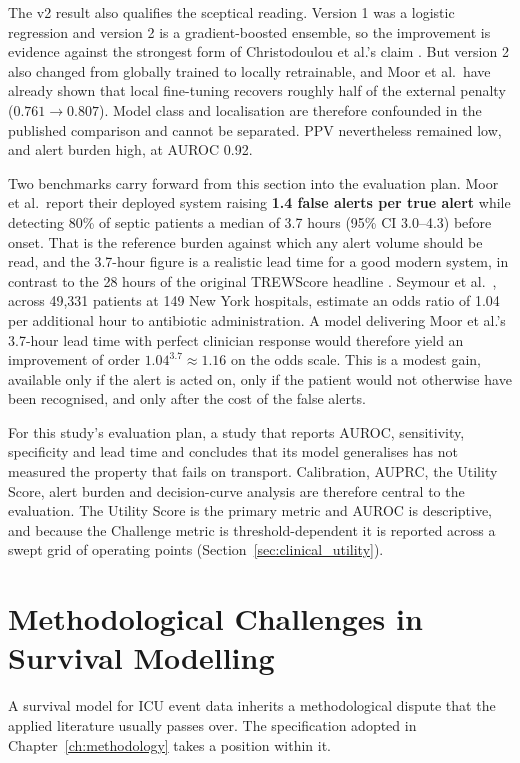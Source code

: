 The v2 result also qualifies the sceptical reading. Version 1 was a logistic
regression and version 2 is a gradient-boosted
ensemble, so the improvement is evidence against the strongest form of
Christodoulou et al.'s claim \cite{christodoulou2019cox}. But version 2 also
changed from globally trained to locally retrainable, and Moor et al.\ have
already shown that local fine-tuning recovers roughly half of the external
penalty ($0.761 \rightarrow 0.807$). Model class and localisation are therefore
confounded in the published comparison and cannot be separated. PPV
nevertheless remained low, and alert burden high, at AUROC 0.92.

Two benchmarks carry forward from this section into the evaluation plan. Moor
et al.\ report their deployed system raising \textbf{1.4 false alerts per true
alert} while detecting 80\% of septic patients a median of 3.7 hours (95\% CI
3.0--4.3) before onset. That is the reference burden against which any alert
volume should be read, and the 3.7-hour figure is a realistic lead time for a
good modern system, in contrast to the 28 hours of the original TREWScore
headline
\cite{henry2015trewscore}. Seymour et al.\ \cite{seymour2017time}, across
49,331 patients at 149 New York hospitals, estimate an odds ratio of 1.04 per
additional hour to antibiotic administration. A model delivering Moor et al.'s
3.7-hour lead time with perfect clinician response would therefore yield an
improvement of order $1.04^{3.7} \approx 1.16$ on the odds scale. This is a
modest gain, available only if the alert is acted on, only if the patient would
not otherwise have been recognised, and only after the cost of the false
alerts.

For this study's evaluation plan, a study that reports AUROC, sensitivity,
specificity and lead time and concludes that its model generalises has not
measured the property that fails on transport. Calibration, AUPRC, the Utility
Score, alert burden and decision-curve analysis are therefore central to the
evaluation. The Utility Score is the primary metric and AUROC is descriptive,
and because the Challenge metric is threshold-dependent it is reported across a
swept grid of operating points (Section~\ref{sec:clinical_utility}).


\section{Methodological Challenges in Survival Modelling}
\label{sec:survival_dispute}

A survival model for ICU event data inherits a methodological dispute that the
applied literature usually passes over. The specification adopted in
Chapter~\ref{ch:methodology} takes a position within it.

